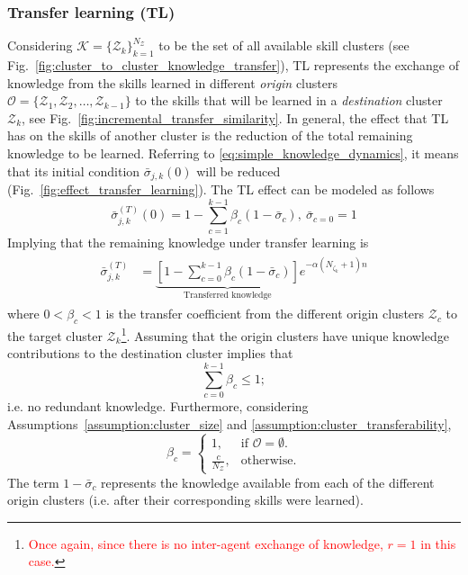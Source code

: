 \subsubsection{\textbf{Transfer learning (TL)}}
Considering $\mathcal{K} = \{ \mathcal{Z}_k \}^{N_\mathcal{Z}}_{k=1}$ to be the set of all available skill clusters (see Fig.~\ref{fig:cluster_to_cluster_knowledge_transfer}), TL represents the exchange of knowledge from the skills learned in different \emph{origin} clusters $\mathcal{O} = \{ \mathcal{Z}_1,\mathcal{Z}_2,\ldots,\mathcal{Z}_{k-1} \}$ to the skills that will be learned in a \emph{destination} cluster $\mathcal{Z}_k$, see Fig.~\ref{fig:incremental_transfer_similarity}. In general, the effect that TL has on the skills of another cluster is the reduction of the total remaining knowledge to be learned. Referring to \eqref{eq:simple_knowledge_dynamics}, it means that its initial condition $\bar{\sigma}_{j,k}(0)$ will be reduced (Fig.~\ref{fig:effect_transfer_learning}). The TL effect can be modeled as follows
\begin{equation}\label{eq:tl_initial_condition}
	\bar{\sigma}^{(T)}_{j,k}(0) = 1 - \sum\limits_{c = 1}^{k-1}\beta_{c} \left( 1 - \bar{\sigma}_{c} \right),~\bar{\sigma}_{c=0} = 1
\end{equation}
Implying that the remaining knowledge under transfer learning is
\begin{align}
	\begin{split}
		\bar{\sigma}^{(T)}_{j,k} 
		&= \underbrace{\left[1- \sum\limits_{c = 0}^{k-1}\beta_{c} \left( 1 - \bar{\sigma}_{c} \right)\right]}_{\text{Transferred knowledge}} e^{-\alpha \left(N_{\zeta_k}+1\right) n}
	\end{split}
\end{align}
where $0<\beta_{c} < 1$ is the transfer coefficient from the different origin clusters $\mathcal{Z}_{c}$ to the target cluster $\mathcal{Z}_{k}$\footnote{\textcolor{red}{Once again, since there is no inter-agent exchange of knowledge, $ r = 1 $ in this case.}}. Assuming that the origin clusters have unique knowledge contributions to the destination cluster implies that
\begin{equation}
	\sum\limits_{c=0}^{k-1}\beta_{c} \leq 1;
\end{equation}
i.e. no redundant knowledge. Furthermore, considering Assumptions~\ref{assumption:cluster_size} and \ref{assumption:cluster_transferability},
\begin{equation}
	\beta_{c}=
	\begin{cases}
		1, & \text{if $\mathcal{O}  = \emptyset$}.\\
		\frac{c}{N_\mathcal{Z}}, & \text{otherwise}.
	\end{cases}
\end{equation}
The term $ 1 - \bar{\sigma}_{c}$ represents the knowledge available from each of the different origin clusters (i.e. after their corresponding skills were learned).

